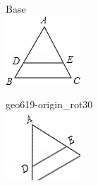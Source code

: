 \documentclass[12pt]{article}
\begin{document}
\begin{center}
\begin{minipage}{0.32\textwidth}\centering
Base\\
\includegraphics[width=0.95\linewidth]{out_rommath_origin/items/geo619-origin/assets/figure.png}
\end{minipage}
\hfill\begin{minipage}{0.32\textwidth}\centering
geo619-origin\_rot30\\
\includegraphics[width=0.95\linewidth]{out_rommath_origin/items/geo619-origin/assets/figure_rot30.png}

\end{minipage}
\end{center}
\end{document}

